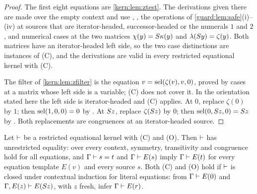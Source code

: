 \begin{proof}
The first eight equations are \cref{kern:lem:ztest}.  The derivations given
there are made over the empty context and use , ,
the operations of \cref{guard:lem:safe}(i)--(iv) at sources that are
iterator-headed, successor-headed or the numerals $1$ and $2$, and
numerical cases at the two matrices $\chi(y)=S\kappa(y)$ and
$\lambda(S y)=\zeta(y)$.  Both matrices have an iterator-headed left
side, so the two case distinctions are instances of (C), and the
derivations are valid in every restricted equational kernel with (C).

The filter of \cref{kern:lem:zfilter} is the equation
$v=\operatorname{sel}(\zeta(v),v,0)$, proved by cases at a matrix whose left side is a
variable; (C) does not cover it.  In the orientation stated here the left
side is iterator-headed and (C) applies.  At $0$, replace $\zeta(0)$ by
$1$; then $\operatorname{sel}(1,0,0)=0$ by .  At $S z$, replace
$\zeta(S z)$ by $0$; then $\operatorname{sel}(0,S z,0)=S z$ by .
Both replacements are congruences at an iterator-headed source.
\end{proof}

\begin{theorem}
\label{guard:thm:dependency}
Let $\vdash$ be a restricted equational kernel with \textup{(C)} and
\textup{(O)}.  Then $\vdash$ has unrestricted equality: over every context,
symmetry, transitivity and congruence hold for all equations, and
$\Gamma\vdash s=t$ and $\Gamma\vdash E(s)$ imply $\Gamma\vdash E(t)$ for
every equation template $E(v)$ and every source $s$.  Both \textup{(C)} and
\textup{(O)} hold if $\vdash$ is closed under contextual induction for
literal equations: from $\Gamma\vdash E(0)$ and
$\Gamma,E(z)\vdash E(S z)$, with $z$ fresh, infer $\Gamma\vdash E(r)$.
\end{theorem}

